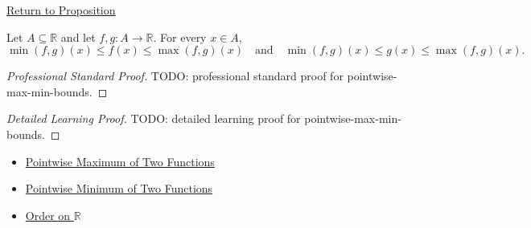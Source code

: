 \newpage
{}
\label{prf:pointwise-max-min-bounds}

\begin{remark*}[Return]
\hyperref[prop:pointwise-max-min-bounds]{Return to Proposition}
\end{remark*}

\begin{proposition*}
Let \(A\subseteq\mathbb{R}\) and let \(f,g:A\to\mathbb{R}\).  For every
\(x\in A\),
\[
  \min(f,g)(x)\leq f(x)\leq \max(f,g)(x)
  \quad\text{and}\quad
  \min(f,g)(x)\leq g(x)\leq \max(f,g)(x).
\]
\end{proposition*}

\begin{proof}[Professional Standard Proof]
\LRAProofBodyStart
TODO: professional standard proof for pointwise-max-min-bounds.
\end{proof}

\begin{proof}[Detailed Learning Proof]
\LRAProofBodyStart
TODO: detailed learning proof for pointwise-max-min-bounds.
\end{proof}

\begin{remark*}
\end{remark*}

\begin{dependencies}
\begin{itemize}
  \item \hyperref[def:pointwise-maximum-of-two-functions]{Pointwise Maximum of Two Functions}
  \item \hyperref[def:pointwise-minimum-of-two-functions]{Pointwise Minimum of Two Functions}
  \item \hyperref[def:order-on-r]{Order on \(\mathbb{R}\)}
\end{itemize}
\end{dependencies}

\clearpage
